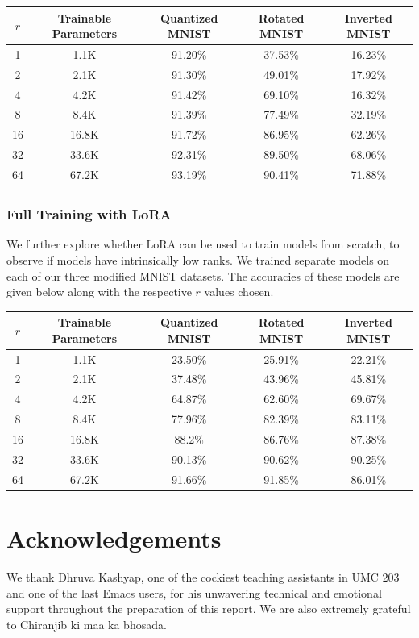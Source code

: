 \documentclass{article}
\newcommand\Tstrut{\rule{0pt}{2.6ex}}
\begin{document}
\begin{center}
    \begin{tabular}{c | c | c | c | c}
        $r$ & Trainable Parameters & Quantized MNIST & Rotated MNIST & Inverted MNIST \\
        \hline
        1 & 1.1K & 91.20\% & 37.53\% & 16.23\% \Tstrut \\
        2 & 2.1K & 91.30\% & 49.01\% & 17.92\% \\
        4 & 4.2K & 91.42\% & 69.10\% & 16.32\% \\
        8 & 8.4K & 91.39\% & 77.49\% & 32.19\% \\
        16 & 16.8K & 91.72\% & 86.95\% & 62.26\% \\
        32 & 33.6K & 92.31\% & 89.50\% & 68.06\% \\
        64 & 67.2K & 93.19\% & 90.41\% & 71.88\%
    \end{tabular}
\end{center}

\subsubsection{Full Training with LoRA}
We further explore whether LoRA can be used to train models from scratch, to observe if models have intrinsically low ranks. We trained separate models on each of our three modified MNIST datasets. The accuracies of these models are given below along with the respective $r$ values chosen.

\begin{center}
    \begin{tabular}{c | c | c | c | c}
        $r$ & Trainable Parameters & Quantized MNIST & Rotated MNIST & Inverted MNIST \\
        \hline
        1 & 1.1K & 23.50\% & 25.91\% & 22.21\% \Tstrut \\
        2 & 2.1K & 37.48\% & 43.96\% & 45.81\% \\
        4 & 4.2K & 64.87\% & 62.60\% & 69.67\% \\
        8 & 8.4K & 77.96\% & 82.39\% & 83.11\% \\
        16 & 16.8K & 88.2\% & 86.76\% & 87.38\% \\
        32 & 33.6K & 90.13\% & 90.62\% & 90.25\% \\
        64 & 67.2K & 91.66\% & 91.85\% & 86.01\%
    \end{tabular}
\end{center}

\section{Acknowledgements}
We thank Dhruva Kashyap, one of the cockiest teaching assistants in UMC 203 and one of the last Emacs users, for his unwavering technical and emotional support throughout the preparation of this report. We are also extremely grateful to Chiranjib ki maa ka bhosada.

\end{document}

